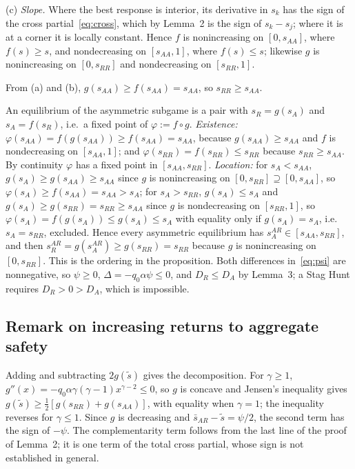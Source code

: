 \documentclass[11pt]{article}
\theoremstyle{plain}
\theoremstyle{definition}
\theoremstyle{remark}
\newcommand{\Sh}{\bar s}
\newcommand{\Delt}{\Delta}
\begin{document}
(c) \emph{Slope.} Where the best response is interior, its derivative in $s_k$ has the sign of the cross partial~\eqref{eq:cross}, which by Lemma~2 is the sign of $s_k-s_j$; where it is at a corner it is locally constant. Hence $f$ is nonincreasing on $[0,s_{AA}]$, where $f(s)\ge s$, and nondecreasing on $[s_{AA},1]$, where $f(s)\le s$; likewise $g$ is nonincreasing on $[0,s_{RR}]$ and nondecreasing on $[s_{RR},1]$.

From (a) and (b), $g(s_{AA})\ge f(s_{AA})=s_{AA}$, so $s_{RR}\ge s_{AA}$.

An equilibrium of the asymmetric subgame is a pair with $s_R=g(s_A)$ and $s_A=f(s_R)$, i.e.\ a fixed point of $\varphi:=f\circ g$. \emph{Existence:} $\varphi(s_{AA})=f(g(s_{AA}))\ge f(s_{AA})=s_{AA}$, because $g(s_{AA})\ge s_{AA}$ and $f$ is nondecreasing on $[s_{AA},1]$; and $\varphi(s_{RR})=f(s_{RR})\le s_{RR}$ because $s_{RR}\ge s_{AA}$. By continuity $\varphi$ has a fixed point in $[s_{AA},s_{RR}]$. \emph{Location:} for $s_A<s_{AA}$, $g(s_A)\ge g(s_{AA})\ge s_{AA}$ since $g$ is nonincreasing on $[0,s_{RR}]\supseteq[0,s_{AA}]$, so $\varphi(s_A)\ge f(s_{AA})=s_{AA}>s_A$; for $s_A>s_{RR}$, $g(s_A)\le s_A$ and $g(s_A)\ge g(s_{RR})=s_{RR}\ge s_{AA}$ since $g$ is nondecreasing on $[s_{RR},1]$, so $\varphi(s_A)=f(g(s_A))\le g(s_A)\le s_A$ with equality only if $g(s_A)=s_A$, i.e.\ $s_A=s_{RR}$, excluded. Hence every asymmetric equilibrium has $s^{AR}_A\in[s_{AA},s_{RR}]$, and then $s^{AR}_R=g(s^{AR}_A)\ge g(s_{RR})=s_{RR}$ because $g$ is nonincreasing on $[0,s_{RR}]$. This is the ordering in the proposition. Both differences in~\eqref{eq:psi} are nonnegative, so $\psi\ge0$, $\Delt=-q_0\alpha\psi\le0$, and $D_R\le D_A$ by Lemma~3; a Stag Hunt requires $D_R>0>D_A$, which is impossible.

\subsection{Remark on increasing returns to aggregate safety}
Adding and subtracting $2g(\tilde s)$ gives the decomposition. For $\gamma\ge1$, $g''(x)=-q_0\alpha\gamma(\gamma-1)x^{\gamma-2}\le0$, so $g$ is concave and Jensen's inequality gives $g(\tilde s)\ge\tfrac12[g(s_{RR})+g(s_{AA})]$, with equality when $\gamma=1$; the inequality reverses for $\gamma\le1$. Since $g$ is decreasing and $\Sh_{AR}-\tilde s=\psi/2$, the second term has the sign of $-\psi$. The complementarity term follows from the last line of the proof of Lemma~2; it is one term of the total cross partial, whose sign is not established in general.
\end{document}
